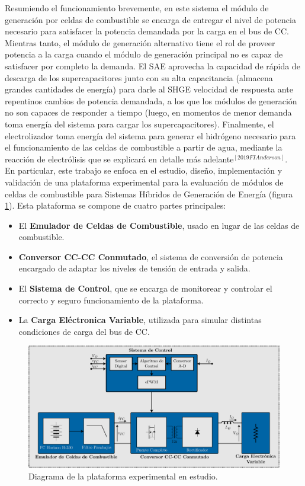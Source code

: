 Resumiendo el funcionamiento brevemente, en este sistema el módulo de generación por celdas de combustible se encarga de entregar el nivel de potencia necesario para satisfacer la potencia demandada por la carga en el bus de CC. Mientras tanto, el módulo de generación alternativo tiene el rol de proveer potencia a la carga cuando el módulo de generación principal no es capaz de satisfacer por completo la demanda. El SAE aprovecha la capacidad de rápida de descarga de los supercapacitores junto con su alta capacitancia (almacena grandes cantidades de energía) para darle al SHGE velocidad de respuesta ante repentinos cambios de potencia demandada, a los que los módulos de generación no son capaces de responder a tiempo (luego, en momentos de menor demanda toma energía del sistema para cargar los supercapacitores). Finalmente, el electrolizador toma energía del sistema para generar el hidrógeno necesario para el funcionamiento de las celdas de combustible a partir de agua, mediante la reacción de electrólisis que se explicará en detalle más adelante$^{[2019FIAnderson]}$.\\

En particular, este trabajo se enfoca en el estudio, diseño, implementación y validación de una plataforma experimental para la evaluación de módulos de celdas de combustible para Sistemas Híbridos de Generación de Energía (figura \ref{diag_plataforma}). Esta plataforma se compone de cuatro partes principales:

\begin{itemize}
    \item El \textbf{Emulador de Celdas de Combustible}, usado en lugar de las celdas de combustible.
    \item \textbf{Conversor CC-CC Conmutado}, el sistema de conversión de potencia encargado de adaptar los niveles de tensión de entrada y salida.
    \item El \textbf{Sistema de Control}, que se encarga de monitorear y controlar el correcto y seguro funcionamiento de la plataforma.
    \item La \textbf{Carga Eléctronica Variable}, utilizada para simular distintas condiciones de carga del bus de CC.
\end{itemize}

\begin{figure}[h]
    \centering
    \includegraphics[scale=0.4]{Imagenes/Plataforma Experimental.pdf}
    \caption{Diagrama de la plataforma experimental en estudio.}
    \label{diag_plataforma}
\end{figure}

